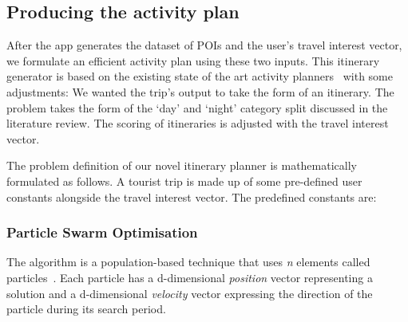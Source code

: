 
\subsection{Producing the activity plan}

After the app generates the dataset of POIs and the
user's travel interest vector, we formulate an
efficient activity plan using these two inputs. This
itinerary generator is based on the existing state of
the art activity planners~\cite{Sylejmani2017, Wisittipanich2020}
with some adjustments: We wanted the trip's output to take the
form of an itinerary.  The problem takes the form of
the `day' and `night'  category split discussed in
the literature review.  The scoring of itineraries is adjusted
with the travel interest vector.

The problem definition of our novel itinerary planner
is mathematically formulated as follows. A tourist trip is made up
of some pre-defined user constants alongside the travel interest
vector. The predefined constants are:
\\




\subsubsection{Particle Swarm Optimisation}

The algorithm is a population-based technique that uses \textit{n}
elements called particles~\cite{Kennedy}. Each particle has a
d-dimensional \textit{position} vector representing a solution
and a d-dimensional \textit{velocity} vector expressing the
direction of the particle during its search period. 

